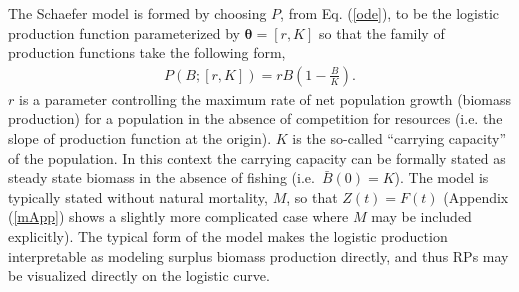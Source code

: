 %
The Schaefer model is formed by choosing $P$, from Eq. (\ref{ode}), to be the 
logistic production function \cite{mangel_theoretical_2006} parameterized by 
$\bm{\theta} = [r, K]$ so that the family of production functions take the 
following form,
%
\begin{align}
P(B; [r, K]) = r B \left(1-\frac{B}{K}\right). \label{logistic}
\end{align}
$r$ is a parameter controlling the maximum rate of net population growth (biomass production) %
for a population in the absence of competition for resources (i.e. the slope 
of production function at the origin). $K$ is the so-called ``carrying 
capacity'' of the population. In this context the carrying capacity can be 
formally stated as steady state biomass in the absence of fishing \mbox{(i.e. 
$\bar B(0)=K$).} The model is typically stated without natural mortality, $M$, 
so that $Z(t)=F(t)$ (Appendix (\ref{mApp}) shows a slightly more complicated 
case where $M$ may be included explicitly). %
The typical form of the model %
makes the logistic production interpretable as modeling surplus 
biomass production directly, and thus RPs may be visualized directly on the logistic curve.  

